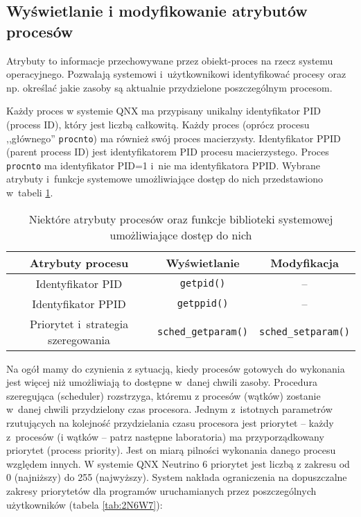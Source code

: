 \subsection{Wyświetlanie i modyfikowanie atrybutów procesów}

Atrybuty to informacje przechowywane przez obiekt-proces na rzecz systemu
operacyjnego. Pozwalają systemowi i~użytkownikowi identyfikować procesy oraz
np. określać jakie zasoby są aktualnie przydzielone poszczególnym procesom.

Każdy proces w systemie QNX ma przypisany unikalny identyfikator PID (process
ID), który jest liczbą całkowitą. Każdy proces (oprócz procesu ,,głównego''
\texttt{procnto}) ma również swój proces macierzysty. Identyfikator PPID
(parent process ID) jest identyfikatorem PID procesu macierzystego. Proces
\texttt{procnto} ma identyfikator PID=1 i~nie ma identyfikatora PPID. Wybrane
atrybuty i~funkcje systemowe umożliwiające dostęp do nich przedstawiono
w~tabeli \ref{tab:HE6LE}.

\begin{table}[h!]
  \centering
  \caption{Niektóre atrybuty procesów oraz funkcje biblioteki systemowej
           umożliwiające dostęp do nich}
  \label{tab:HE6LE}
  \begin{tabular}{|c|c|c|}
    \hline
    \textbf{Atrybuty procesu} & \textbf{Wyświetlanie} & \textbf{Modyfikacja} \\ \hline
    Identyfikator PID                   & \texttt{getpid()}           & -- \\ \hline
    Identyfikator PPID                  & \texttt{getppid()}          & -- \\ \hline
    Priorytet i~strategia szeregowania  & \texttt{sched\_getparam()}  & \texttt{sched\_setparam()} \\ \hline
  \end{tabular}
\end{table}

Na ogół mamy do czynienia z sytuacją, kiedy procesów gotowych do wykonania jest
więcej niż umożliwiają to dostępne w~danej chwili zasoby. Procedura szeregująca
(scheduler) rozstrzyga, któremu z procesów (wątków) zostanie w~danej chwili
przydzielony czas procesora. Jednym z~istotnych parametrów rzutujących na
kolejność przydzielania czasu procesora jest priorytet -- każdy z procesów (i
wątków -- patrz następne laboratoria) ma przyporządkowany priorytet (process
priority).  Jest on miarą pilności wykonania danego procesu względem innych.
W systemie QNX Neutrino 6 priorytet jest liczbą z zakresu od 0 (najniższy) do
255 (najwyższy). System nakłada ograniczenia na dopuszczalne zakresy
priorytetów dla programów uruchamianych przez poszczególnych użytkowników
(tabela \ref{tab:2N6W7}):

